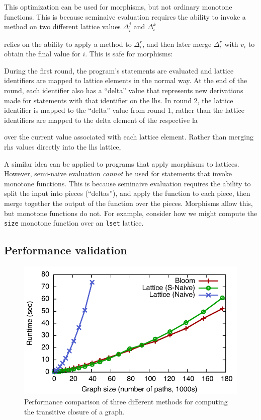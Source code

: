 This optimization can be used for morphisms, but not ordinary monotone
functions. This is because seminaive evaluation requires the ability to invoke a
method on two different lattice values $\Delta^j_i$ and $\Delta^k_i$

 relies on the ability to apply a
method to $\Delta^r_i$, and then later merge $\Delta^r_i$ with $v_i$ to obtain
the final value for $i$. This is safe for morphisms:

 During the first round, the program's statements are evaluated and
lattice identifiers are mapped to lattice elements in the normal way. At the end
of the round, each identifier also has a ``delta'' value that represents new
derivations made for statements with that identifier on the lhs. In round 2, the
lattice identifier is mapped to the ``delta'' value from round 1, rather than
the lattice identifiers are mapped to the delta element of the respective la

 over
the current value associated with each lattice element. Rather than merging rhs
values directly into the lhs lattice, 

A similar idea can be applied to \lang programs that apply morphisms to
lattices. However, semi-naive evaluation \emph{cannot} be used for \lang
statements that invoke monotone functions. This is because seminaive evaluation
requires the ability to split the input into pieces (``deltas''), and apply the
function to each piece, then merge together the output of the function over the
pieces. Morphisms allow this, but monotone functions do not. For example,
consider how we might compute the \texttt{size} monotone function over an
\texttt{lset} lattice.


\subsection{Performance validation}
\label{sec:lattice-perf}
\begin{figure}[t]
\includegraphics[width=\linewidth]{fig/sn_perf}
\caption{Performance comparison of three different methods for computing the
  transitive closure of a graph.}
\label{fig:tc-perf-graph}
\end{figure}

